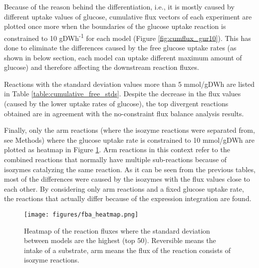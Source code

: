 \vspace{-1.0cm}

Because of the reason behind the differentiation, i.e., it is mostly caused by different uptake values of glucose, cumulative flux vectors of each experiment are plotted once more when the boundaries of the glucose uptake reaction is constrained to 10 gDWh\textsuperscript{-1} for each model (Figure \ref{fig:cumflux_gur10}). This has done to eliminate the differences caused by the free glucose uptake rates (as shown in below section, each model can uptake different maximum amount of glucose) and therefore affecting the downstream reaction fluxes.

Reactions with the standard deviation values more than 5 mmol/gDWh are listed in Table \ref{table:cumulative_free_stds}. Despite the decrease in the flux values (caused by the lower uptake rates of glucose), the top divergent reactions obtained are in agreement with the no-constraint flux balance analysis results.



\vspace{-1.0cm}






\vspace{-1.0cm}

Finally, only the arm reactions (where the isozyme reactions were separated from, see Methods) where the glucose uptake rate is constrained to 10 mmol/gDWh are plotted as heatmap in Figure \ref{fig:fba_heatmap}. Arm reactions in this context refer to the combined reactions that normally have multiple sub-reactions because of isozymes catalyzing the same reaction. As it can be seen from the previous tables, most of the differences were caused by the isozymes with the flux values close to each other. By considering only arm reactions and a fixed glucose uptake rate, the reactions that actually differ because of the expression integration are found.

\begin{figure}[H]
  \begin{center}
  \texttt{[image: figures/fba\_heatmap.png]}
  \caption[Heatmap of the reaction fluxes where the standard deviation between models are the highest (top 50). Reversible means the intake of a substrate, arm means the flux of the reaction consists of isozyme reactions]{Heatmap of the reaction fluxes where the standard deviation between models are the highest (top 50). Reversible means the intake of a substrate, arm means the flux of the reaction consists of isozyme reactions.}
  \label{fig:fba_heatmap}
  \end{center}
\end{figure}


